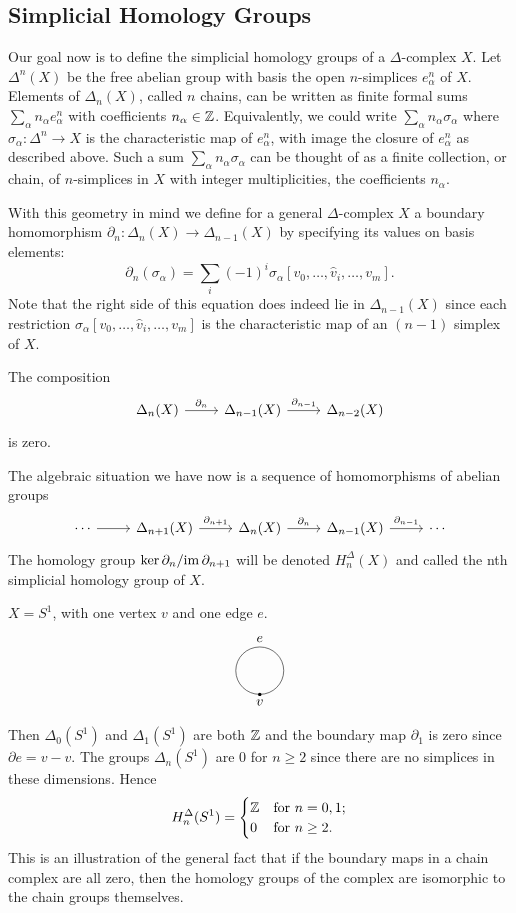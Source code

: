 \subsection{Simplicial Homology Groups}
Our goal now is to define the simplicial homology groups of a $\Delta$-complex $X$. Let $\Delta^n(X)$ be the free abelian group with basis the open $n$-simplices $e^n_\alpha$ of $X$. Elements of $\Delta_n(X)$, called $n$ chains, can be written as finite formal sums $\sum_\alpha n_\alpha e^n_\alpha$ with coefficients $n_\alpha\in\mathbb{Z}$. Equivalently, we could write $\sum_\alpha n_\alpha\sigma_\alpha$ where $\sigma_\alpha:\Delta^n\to X$ is the
characteristic map of $e^n_\alpha$, with image the closure of $e^n_\alpha$ as described above. Such a sum $\sum_\alpha n_\alpha\sigma_\alpha$ can be thought of as a finite collection, or chain, of $n$-simplices in $X$ with integer multiplicities, the coefficients $n_\alpha$.\par
With this geometry in mind we define for a general $\Delta$-complex $X$ a boundary homomorphism $\partial_n:\Delta_n(X)\to\Delta_{n-1}(X)$ by specifying its values on basis elements:
\[\partial_n(\sigma_\alpha)=\sum_i(-1)^i\sigma_\alpha[v_0,\dots,\widehat{v}_i,\dots,v_m].\]
Note that the right side of this equation does indeed lie in $\Delta_{n-1}(X)$ since each restriction $\sigma_\alpha[v_0,\dots,\widehat{v}_i,\dots,v_m]$ is the characteristic map of an $(n-1)$ simplex of $X$.\par
\begin{lemma}
The composition 
\[\begin{tikzcd}
\Delta_n(X)\ar[r,"\partial_n"]&\Delta_{n-1}(X)\ar[r,"\partial_{n-1}"]&\Delta_{n-2}(X)
\end{tikzcd}\]
is zero.
\end{lemma}
The algebraic situation we have now is a sequence of homomorphisms of abelian
groups
\[\begin{tikzcd}
\cdots\ar[r]&\Delta_{n+1}(X)\ar[r,"\partial_{n+1}"]&\Delta_{n}(X)\ar[r,"\partial_{n}"]&\Delta_{n-1}(X)\ar[r,"\partial_{n-1}"]&\cdots
\end{tikzcd}\]
The homology group $\mathrm{ker}\,\partial_n/\mathrm{im}\,\partial_{n+1}$ will be denoted $H^\Delta_n(X)$ and called the nth simplicial homology group of $X$.
\begin{example}
$X=S^1$, with one vertex $v$ and one edge $e$. 
\[\begin{tikzpicture}[scale=0.6]
\draw (0,1) circle [radius=1];
\node [above] at (0,2) {$e$};
\node (v) [below,dotted] at (0,0) {$v$};
\fill[black] (0,0) circle (2pt);
\end{tikzpicture}\]
Then $\Delta_0(S^1)$ and $\Delta_1(S^1)$ are both $\mathbb{Z}$ and the boundary map $\partial_1$ is zero since $\partial e=v-v$. The groups $\Delta_n(S^1)$ are $0$ for $n\geq2$ since there are no simplices in these dimensions. Hence
\[H_n^\Delta(S^1)=\begin{cases}
\mathbb{Z}&\text{for }n=0,1;\\
0&\text{for }n\geq 2.
\end{cases}\]
This is an illustration of the general fact that if the boundary maps in a chain complex are all zero, then the homology groups of the complex are isomorphic to the chain groups themselves.
\end{example}
